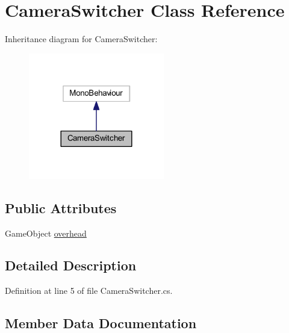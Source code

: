 \hypertarget{class_camera_switcher}{}\section{Camera\+Switcher Class Reference}
\label{class_camera_switcher}


Inheritance diagram for Camera\+Switcher\+:
\nopagebreak
\begin{figure}[H]
\begin{center}
\leavevmode
\includegraphics[width=168pt]{class_camera_switcher__inherit__graph}
\end{center}
\end{figure}
\subsection*{Public Attributes}
\begin{DoxyCompactItemize}
\item 
Game\+Object \hyperlink{class_camera_switcher_a0d569047675f3c1f3f282171dc5ed434}{overhead}
\end{DoxyCompactItemize}


\subsection{Detailed Description}


Definition at line 5 of file Camera\+Switcher.\+cs.



\subsection{Member Data Documentation}
\mbox{\label{class_camera_switcher_a0d569047675f3c1f3f282171dc5ed434}} 
